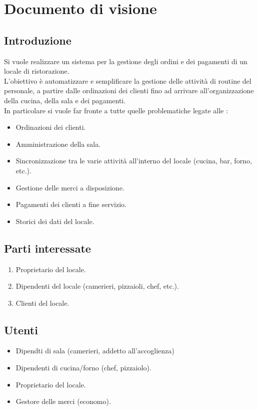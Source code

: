 \chapter{Documento di visione}
\section{Introduzione}
\justifying

Si vuole realizzare un sistema per la gestione degli ordini e dei pagamenti di un locale di ristorazione.\\
L’obiettivo è automatizzare e semplificare la gestione delle attività di routine del personale, a partire dalle ordinazioni dei clienti fino ad arrivare all’organizzazione della cucina, della sala e dei pagamenti.\\ 
In particolare si vuole far fronte a tutte quelle problematiche legate alle :
\begin{itemize}
    \item Ordinazioni dei clienti.
    \item Amministrazione della sala.
    \item Sincronizzazione tra le varie attività all’interno del locale (cucina, bar, forno, etc.).
    \item Gestione delle merci a disposizione.
    \item Pagamenti dei clienti a fine servizio.
    \item Storici dei dati del locale.

\end{itemize}
\hfill \break

\section{Parti interessate}
\begin{enumerate}
    \item Proprietario del locale.
    \item Dipendenti del locale (camerieri, pizzaioli, chef, etc.).
    \item Clienti del locale.
\end{enumerate}

\section{Utenti}
\begin{itemize}
    \item Dipendti di sala (camerieri, addetto all'accoglienza) 
    \item Dipendenti di cucina/forno (chef, pizzaiolo).
    \item Proprietario del locale.
    \item Gestore delle merci (economo).
\end{itemize}

